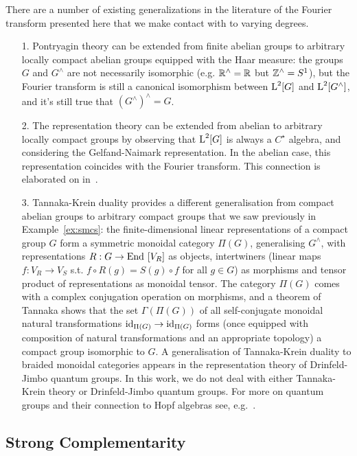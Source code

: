There are a number of existing generalizations in the literature of the Fourier transform presented here that we make contact with to varying degrees. 
\begin{enumerate}
\item[1.] Pontryagin theory can be extended from finite abelian groups to arbitrary locally compact abelian groups equipped with the Haar measure: the groups $G$ and $G^\wedge$ are not necessarily isomorphic (e.g. $\mathbb{R}^\wedge = \mathbb{R}$ but $\mathbb{Z}^\wedge = S^1$), but the Fourier transform is still a canonical isomorphism between $\operatorname{L}^2[G]$ and $\operatorname{L}^2[G^\wedge]$, and it's still true that $(G^\wedge)^\wedge = G$. 

\item[2.] The representation theory can be extended from abelian to arbitrary locally compact groups by observing that $\operatorname{L}^2[G]$ is always a $C^\star$ algebra, and considering the Gelfand-Naimark representation. In the abelian case, this representation coincides with the Fourier transform. This connection is elaborated on in~\cite{gogioso2015fourier}. 

\item[3.] Tannaka-Krein duality provides a different generalisation from compact abelian groups to arbitrary compact groups that we saw previously in Example~\ref{ex:smcs}: the finite-dimensional linear representations of a compact group $G$ form a symmetric monoidal category $\Pi(G)$, generalising $G^\wedge$, with representations $R:G \rightarrow \operatorname{End}_{\,}\left[V_R\right]$ as objects, intertwiners (linear maps $f: V_R \rightarrow V_S$ s.t. $f \circ R(g) = S(g) \circ f$ for all $g\in G$) as morphisms and tensor product of representations as monoidal tensor. The category $\Pi(G)$ comes with a complex conjugation operation on morphisms, and a theorem of Tannaka shows that the set $\Gamma(\Pi(G))$ of all self-conjugate monoidal natural transformations $\mbox{id}_{\Pi(G)} \rightarrow \mbox{id}_{\Pi(G)}$ forms (once equipped with composition of natural transformations and an appropriate topology) a compact group isomorphic to $G$. A generalisation of Tannaka-Krein duality to braided monoidal categories appears in the representation theory of Drinfeld-Jimbo quantum groups. In this work, we do not deal with either Tannaka-Krein theory or Drinfeld-Jimbo quantum groups.
For more on quantum groups and their connection to Hopf algebras see, 
e.g.~\cite{cartier2007primer,street2007quantum}.
\end{enumerate}

\subsection{Strong Complementarity}
\label{sec:strcompl}

